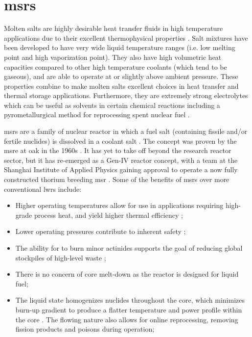 \section{\texorpdfstring{\aclp{msr}}{Molten Salt Reactors}}
Molten salts are highly desirable heat transfer fluids in high temperature applications due to their excellent thermophysical properties \cite{RoperReview}. Salt mixtures have been developed to have very wide liquid temperature ranges (i.e. low melting point and high vaporization point). They also have high volumetric heat capacities compared to other high temperature coolants (which tend to be gaseous), and are able to operate at or slightly above ambient pressure. These properties combine to make molten salts excellent choices in heat transfer and thermal storage applications. Furthermore, they are extremely strong electrolytes which can be useful as solvents in certain chemical reactions including a pyrometallurgical method for reprocessing spent nuclear fuel \cite{Simpson}.

\acfp{msr} are a family of nuclear reactor in which a fuel salt (containing fissile and/or fertile nuclides) is dissolved in a coolant salt \cite{RoperOverview}. The concept was proven by the \acf{msre} at \acf{oak} in the 1960s \cite{MSRE}. It has yet to take off beyond the research reactor sector, but it has re-emerged as a Gen-IV reactor concept, with a team at the Shanghai Institute of Applied Physics gaining approval to operate a now fully constructed thorium breeding \acs{msr} \cite{china}. Some of the benefits of \acsp{msr} over more conventional \acsp{lwr} include:
\begin{itemize}
    \item Higher operating temperatures allow for use in applications requiring high-grade process heat, and yield higher thermal efficiency \cite{RoperOverview};
    \item Lower operating pressures contribute to inherent safety \cite{RoperReview};
    \item The ability for to burn minor actinides supports the goal of reducing global stockpiles of high-level waste \cite{RoperReview};
    \item There is no concern of core melt-down as the reactor is designed for liquid fuel;
    \item The liquid state homogenizes nuclides throughout the core, which minimizes burn-up gradient to produce a flatter temperature and power profile within the core \cite[Ch. 3]{TodreasKazimi1}. The flowing nature also allows for online reprocessing, removing fission products and poisons during operation;
\end{itemize}


